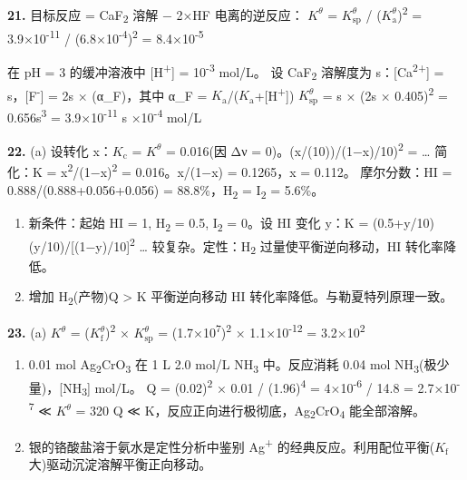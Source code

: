 \textbf{21.} 目标反应 = CaF\textsubscript{2} 溶解 − 2×HF 电离的逆反应：
\(K^\theta\) = \(K_{\mathrm{sp}}^\theta\) / (\(K_{\mathrm a}^\theta\))\textsuperscript{2} = 3.9×10\textsuperscript{-11} / (6.8×10\textsuperscript{-4})\textsuperscript{2} = 8.4×10\textsuperscript{-5}

在 pH = 3 的缓冲溶液中 {[}H\textsuperscript{+}{]} = 10\textsuperscript{-3} mol/L。
设 CaF\textsubscript{2} 溶解度为 s：{[}Ca\textsuperscript{2+}{]} = s，{[}F\textsuperscript{-}{]} = 2s × (α\_F)，其中 α\_F = \(K_{\mathrm a}\)/(\(K_{\mathrm a}\)+{[}H\textsuperscript{+}{]}) 
\(K_{\mathrm{sp}}^\theta\) = s × (2s × 0.405)\textsuperscript{2} = 0.656s\textsuperscript{3} = 3.9×10\textsuperscript{-11} \箭 s ×10\textsuperscript{-4} mol/L

\textbf{22.}
(a) 设转化 x：\(K_{\mathrm c}\) = \(K^\theta\) = 0.016(因 Δν = 0)。(x/(10))/(1−x)/10)\textsuperscript{2} = \ldots{} 简化：K = x\textsuperscript{2}/(1−x)\textsuperscript{2} = 0.016。x/(1−x) = 0.1265，x = 0.112。
摩尔分数：HI = 0.888/(0.888+0.056+0.056) = 88.8\%，H\textsubscript{2} = I\textsubscript{2} = 5.6\%。

\begin{enumerate}
\def\labelenumi{(\alph{enumi})}
\setcounter{enumi}{1}
\item
  新条件：起始 HI = 1, H\textsubscript{2} = 0.5, I\textsubscript{2} = 0。设 HI 变化 y：K = (0.5+y/10)(y/10)/{[}(1−y)/10{]}\textsuperscript{2} \ldots{} 较复杂。定性：H\textsubscript{2} 过量使平衡逆向移动，HI 转化率降低。
\item
  增加 H\textsubscript{2}(产物)\箭 Q \textgreater{} K \箭 平衡逆向移动 \箭 HI 转化率降低。与勒夏特列原理一致。
\end{enumerate}

\textbf{23.}
(a) \(K^\theta\) = (\(K_{\mathrm f}^\theta\))\textsuperscript{2} × \(K_{\mathrm{sp}}^\theta\) = (1.7×10\textsuperscript{7})\textsuperscript{2} × 1.1×10\textsuperscript{-12} = 3.2×10\textsuperscript{2}

\begin{enumerate}
\def\labelenumi{(\alph{enumi})}
\setcounter{enumi}{1}
\item
  0.01 mol Ag\textsubscript{2}CrO\textsubscript{3} 在 1 L 2.0 mol/L NH\textsubscript{3} 中。反应消耗 0.04 mol NH\textsubscript{3}(极少量)，{[}NH\textsubscript{3}{]}  mol/L。
  Q = (0.02)\textsuperscript{2} × 0.01 / (1.96)\textsuperscript{4} = 4×10\textsuperscript{-6} / 14.8 = 2.7×10\textsuperscript{-7} ≪ \(K^\theta\) = 320
  Q ≪ K，反应正向进行极彻底，Ag\textsubscript{2}CrO\textsubscript{4} 能全部溶解。
\item
  银的铬酸盐溶于氨水是定性分析中鉴别 Ag\textsuperscript{+} 的经典反应。利用配位平衡(\(K_{\mathrm f}\) 大)驱动沉淀溶解平衡正向移动。
\end{enumerate}

